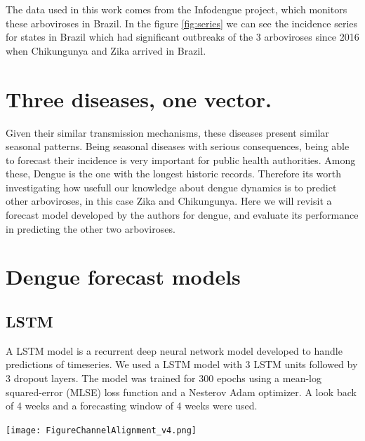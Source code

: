 \documentclass[a0,portrait]{a0poster}
\begin{document}
\begin{multicols}{3}
The data used in this work comes from the Infodengue project, which monitors 
these arboviroses in Brazil. In the figure \ref{fig:series} we can see the 
incidence series for states in Brazil which had significant outbreaks of the 3 
arboviroses since 2016 when Chikungunya and Zika arrived in Brazil.
\section*{Three diseases, one vector.}

\noindent
Given their similar transmission mechanisms, these diseases present similar 
seasonal patterns. Being seasonal diseases with serious consequences, being 
able to forecast their incidence is very important for public health 
authorities. Among these, Dengue is the one with the longest historic records. 
Therefore its worth investigating how usefull our knowledge about dengue 
dynamics is to predict other arboviroses, in this case Zika and Chikungunya. 
Here we will revisit a forecast model developed by the authors for dengue, and 
evaluate its performance in predicting the other two arboviroses.




\section*{Dengue forecast models}
\subsection*{LSTM}
\noindent
A LSTM model is a recurrent deep neural network model developed to handle 
predictions of timeseries. We used a LSTM model with 3 LSTM units followed by 
3 dropout layers. The model was trained for 300 epochs using a mean-log 
squared-error (MLSE) loss function  and a Nesterov Adam 
optimizer\cite{sutskever2013importance}. A look back of 4 weeks and a 
forecasting window of 4 weeks were used.

\begin{center}\vspace{1cm}
    \texttt{[image: FigureChannelAlignment\_v4.png]}
\end{center}%


\end{multicols}
\end{document}
